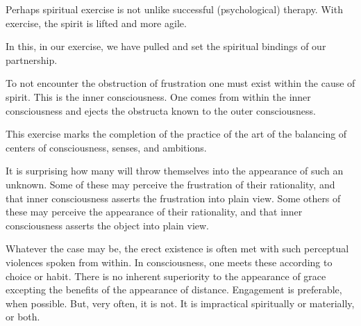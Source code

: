 Perhaps spiritual exercise is not unlike successful (psychological)
therapy.  With exercise, the spirit is \break lifted and more agile.

In this, in our exercise, we have pulled and set the spiritual
bindings of our partnership.


\vfill
\break


To not encounter the obstruction of frustration one must exist within
the cause of spirit.  This is the inner consciousness.  One comes from
within the inner consciousness and ejects the obstructa known to the
outer consciousness.

This exercise marks the completion of the practice of the art of the
balancing of centers of consciousness, senses, and ambitions.


\vfill
\break


It is surprising how many will throw themselves into the appearance of
such an unknown.  Some of these may perceive the frustration of their
rationality, and that inner consciousness asserts the frustration into
plain view.  Some others of these may perceive the appearance of their
rationality, and that inner consciousness asserts the object into
plain view.  

Whatever the case may be, the erect existence is often met with such
perceptual violences spoken from within.  In consciousness, one meets
these according to choice or habit.  There is no inherent superiority
to the appearance of grace excepting the benefits of the appearance of
distance.  Engagement is preferable, when possible.  But, very often,
it is not.  It is impractical spiritually or materially, or both.


\vfill
\bye
